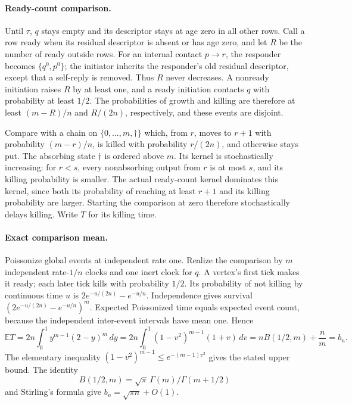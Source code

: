 \documentclass[11pt]{article}
\begin{document}
\paragraph{Ready-count comparison.}
Until $\tau$, $q$ stays empty and its descriptor stays at age zero in all
other rows. Call a row ready when its residual descriptor is absent or has
age zero, and let $R$ be the number of ready outside rows. For an internal
contact $p\to r$, the responder becomes $\{q^0,p^0\}$; the initiator inherits
the responder's old residual descriptor, except that a self-reply is
removed. Thus $R$ never decreases. A nonready initiation raises $R$ by at
least one, and a ready initiation contacts $q$ with probability at least
$1/2$. The probabilities of growth and killing are therefore at least
$(m-R)/n$ and $R/(2n)$, respectively, and these events are disjoint.

Compare with a chain on $\{0,\ldots,m,\dagger\}$ which, from $r$, moves to
$r+1$ with probability $(m-r)/n$, is killed with probability $r/(2n)$, and
otherwise stays put. The absorbing state $\dagger$ is ordered above $m$.
Its kernel is stochastically increasing: for $r<s$, every nonabsorbing
output from $r$ is at most $s$, and its killing probability is smaller.
The actual ready-count kernel dominates this kernel, since both its
probability of reaching at least $r+1$ and its killing probability are
larger. Starting the comparison at zero therefore stochastically delays
killing. Write $T$ for its killing time.

\paragraph{Exact comparison mean.}
Poissonize global events at independent rate one. Realize the comparison
by $m$ independent rate-$1/n$ clocks and one inert clock for $q$. A vertex's
first tick makes it ready; each later tick kills with probability $1/2$.
Its probability of not killing by continuous time $u$ is
$2e^{-u/(2n)}-e^{-u/n}$. Independence gives survival
$(2e^{-u/(2n)}-e^{-u/n})^m$. Expected Poissonized time equals expected event
count, because the independent inter-event intervals have mean one. Hence
\[
 \mathbb ET=2n\int_0^1 y^{m-1}(2-y)^m\,dy
 =2n\int_0^1(1-v^2)^{m-1}(1+v)\,dv
 =nB(1/2,m)+\frac nm=b_n.
\]
The elementary inequality $(1-v^2)^{m-1}\le e^{-(m-1)v^2}$ gives the stated
upper bound. The identity
\[B(1/2,m)=\sqrt\pi\,\Gamma(m)/\Gamma(m+1/2)\]
and Stirling's formula give
$b_n=\sqrt{\pi n}+O(1)$.
\end{document}
